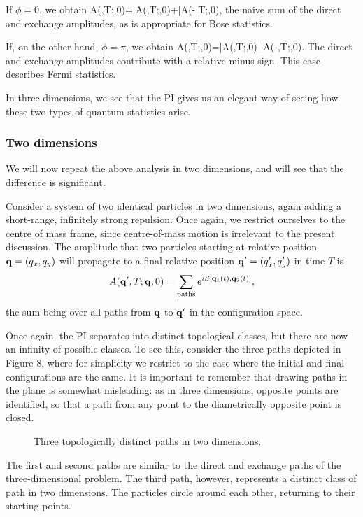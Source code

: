 \documentclass[12pt]{article}
\begin{document}
If $\phi=0$, we obtain
\beq
A(\bfq,T;\bfq,0)=\bar A(\bfq,T;\bfq,0)+\bar A(-\bfq,T;\bfq,0),
\label{stat3}
\eeq
the naive sum of the direct and exchange
amplitudes, as is appropriate for Bose statistics.

If, on the other hand, $\phi=\pi$, we obtain
\beq
A(\bfq,T;\bfq,0)=\bar A(\bfq,T;\bfq,0)-\bar A(-\bfq,T;\bfq,0).
\label{stat4}
\eeq
The direct and exchange amplitudes contribute with a relative minus
sign. This case describes Fermi statistics. 

In three dimensions, we see that the PI gives us an elegant way of
seeing how these two types of quantum statistics arise.

\subsubsection{Two dimensions}

We will now repeat the above analysis in two dimensions, and
will see that the difference is significant.

Consider a system of two identical particles in two dimensions, again
adding a short-range, infinitely strong repulsion.
Once again, we restrict
ourselves to the centre of mass frame, since centre-of-mass
motion is irrelevant to the present discussion.
The amplitude that two particles starting at relative position
${\mathbf q}=(q_x,q_y)$ will propagate to a final relative position
${\mathbf q}'=(q_x',q_y')$ in time $T$ is
\[ A({\mathbf q}',T;{\mathbf q},0)=\sum_{\mathrm{paths}}e^{iS[{\mathbf q}_1(t),{\mathbf q}_2(t)]},
\]
the sum being over all paths from ${\mathbf q}$ to ${\mathbf q}'$ in the
configuration space. 

Once again, the PI separates into distinct topological classes, but
there are now an infinity of possible classes. To see this, consider
the three paths depicted in Figure 8,
where for simplicity we restrict to the
case where the initial and final configurations are the same. It
is important to remember that drawing paths in the plane is somewhat
misleading: as in three dimensions, 
opposite points are identified, so that a path
from any point to the diametrically opposite point is closed.

\begin{figure}[ht]
\epsfysize=5cm
\centerline{}
\caption{Three topologically distinct paths in two dimensions.}
\end{figure}


The first and second paths are similar to the direct and exchange
paths of the three-dimensional problem. The third path, however,
represents a distinct class of path in two dimensions. The particles
circle around each other, returning to their starting points.
\end{document}
